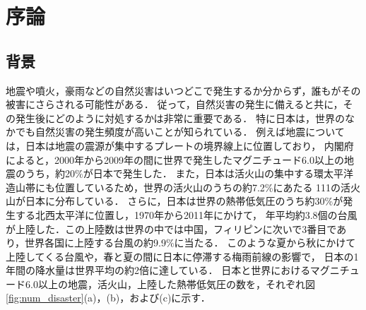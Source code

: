 \chapter{序論}
\thispagestyle{empty}
\label{ch:Introduction}
\minitoc


\newpage

\section{背景}\label{sec:Background}


地震や噴火，豪雨などの自然災害はいつどこで発生するか分からず，誰もがその被害にさらされる可能性がある．
従って，自然災害の発生に備えると共に，その発生後にどのように対処するかは非常に重要である．%
特に日本は，世界のなかでも自然災害の発生頻度が高いことが知られている．
例えば地震については，日本は地震の震源が集中するプレートの境界線上に位置しており，
内閣府によると，2000年から2009年の間に世界で発生したマグニチュード6.0以上の地震のうち，約20$\%$が日本で発生した\cite{内閣府2010}．
また，日本は活火山の集中する環太平洋造山帯にも位置しているため，世界の活火山のうちの約7.2\%にあたる
111の活火山が日本に分布している\cite{内閣府2010}\cite{気象庁2019a}．
さらに，日本は世界の熱帯低気圧のうち約30\%が発生する北西太平洋に位置し，1970年から2011年にかけて，
年平均約3.8個の台風が上陸した．この上陸数は世界の中では中国，フィリピンに次いで3番目であり，世界各国に上陸する台風の約9.9$\%$に当たる\cite{廣瀬2014}\cite{気象キャスターネットワーク2014}．
このような夏から秋にかけて上陸してくる台風や，春と夏の間に日本に停滞する梅雨前線の影響で，
日本の1年間の降水量は世界平均の約2倍に達している\cite{国交省2004}\cite{気象庁2019b}．
日本と世界におけるマグニチュード6.0以上の地震，活火山，上陸した熱帯低気圧の数を，それぞれ図\ref{fig:num_disaster}(a)，(b)，および(c)に示す．

